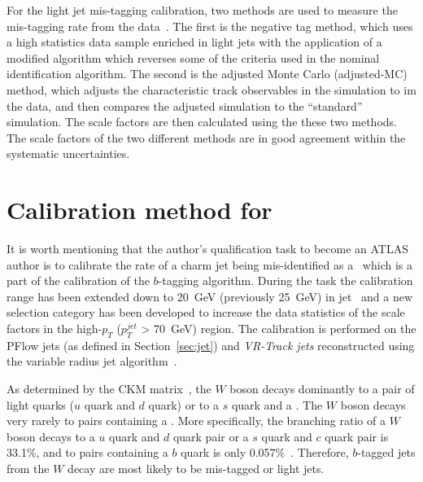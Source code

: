 For the light jet mis-tagging calibration, two methods are 
used to measure the mis-tagging rate from the data~\cite{ATLAS-CONF-2018-006}. 
The first is the negative tag method, which uses a high statistics data sample enriched 
in light jets with the application of a modified algorithm which 
reverses some of the criteria used in the nominal identification 
algorithm.
The second is the adjusted Monte Carlo (adjusted-MC) method, which 
adjusts the characteristic track observables in the simulation 
to im the data, and then compares the adjusted simulation to the 
``standard'' simulation. The scale factors are then calculated using 
the these two methods. The scale factors of the two different methods 
are in good agreement within the systematic uncertainties. 
\section{Calibration method for \cjet}
\label{sec:Calibration method for charm jet}
It is worth mentioning that the author's qualification task to become an ATLAS author is to 
calibrate the rate of a charm jet being mis-identified as a \bjet\, which is a part 
of the calibration of the $b$-tagging algorithm.
During the task the calibration range has been extended down to 20~GeV (previously 25~GeV) in
jet \pt\ and a new selection category has been developed 
to increase the data statistics of the scale factors in the 
high-$p_T$ ($p_T^{jet}$ > 70~GeV) region.
The calibration is performed on the PFlow jets (as defined in Section~\ref{sec:jet})
and \textit{VR-Track jets} reconstructed using the variable radius jet algorithm~\cite{VRTrackJet}.

As determined by the CKM matrix~\cite{CKM1,CKM2}, the $W$ boson decays dominantly to 
a pair of light quarks ($u$ quark and $d$ quark) or to
a $s$ quark and a \cquark. The $W$ boson decays very rarely to pairs containing a \bquark. 
More specifically, the branching ratio of a $W$ boson decays to a $u$ quark and $d$ quark pair or 
a $s$ quark and $c$ quark pair is 33.1\%, and to pairs containing a $b$ quark is only 0.057\%~\cite{PDG}. 
Therefore, $b$-tagged jets from the $W$ decay are most likely 
to be mis-tagged \cjets or light jets. 

